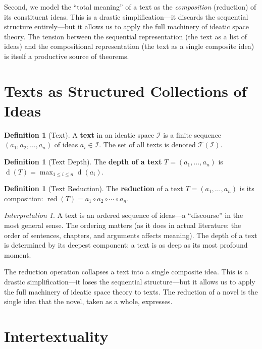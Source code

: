 \documentclass[11pt,openany]{book}
\theoremstyle{definition}
\newtheorem{definition}[axiom]{Definition}
\theoremstyle{plain}
\theoremstyle{remark}
\newtheorem{interpretation}[axiom]{Interpretation}
\newcommand{\IS}{\mathcal{I}}               %
\newcommand{\compose}{\circ}                 %
\newcommand{\depth}{\operatorname{d}}       %
\begin{document}
Second, we model the ``total meaning'' of a text as the \emph{composition} (reduction) of its constituent ideas. This is a drastic simplification---it discards the sequential structure entirely---but it allows us to apply the full machinery of ideatic space theory. The tension between the sequential representation (the text as a list of ideas) and the compositional representation (the text as a single composite idea) is itself a productive source of theorems.

\section{Texts as Structured Collections of Ideas}

\begin{definition}[Text]
A \textbf{text} in an ideatic space $\IS$ is a finite sequence $(a_1, a_2, \ldots, a_n)$ of ideas $a_i \in \IS$. The set of all texts is denoted $\mathcal{T}(\IS)$.
\end{definition}

\begin{definition}[Text Depth]
The \textbf{depth of a text} $T = (a_1, \ldots, a_n)$ is $\depth(T) = \max_{1 \leq i \leq n} \depth(a_i)$.
\end{definition}

\begin{definition}[Text Reduction]
The \textbf{reduction} of a text $T = (a_1, \ldots, a_n)$ is its composition: $\operatorname{red}(T) = a_1 \compose a_2 \compose \cdots \compose a_n$.
\end{definition}

\begin{interpretation}
A text is an ordered sequence of ideas---a ``discourse'' in the most general sense. The ordering matters (as it does in actual literature: the order of sentences, chapters, and arguments affects meaning). The depth of a text is determined by its deepest component: a text is as deep as its most profound moment.

The reduction operation collapses a text into a single composite idea. This is a drastic simplification---it loses the sequential structure---but it allows us to apply the full machinery of ideatic space theory to texts. The reduction of a novel is the single idea that the novel, taken as a whole, expresses.
\end{interpretation}

\section{Intertextuality}
\end{document}
